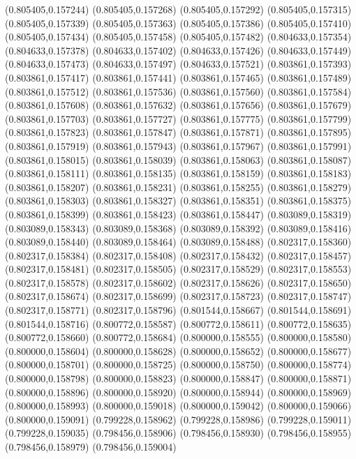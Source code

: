 (0.805405,0.157244)
(0.805405,0.157268)
(0.805405,0.157292)
(0.805405,0.157315)
(0.805405,0.157339)
(0.805405,0.157363)
(0.805405,0.157386)
(0.805405,0.157410)
(0.805405,0.157434)
(0.805405,0.157458)
(0.805405,0.157482)
(0.804633,0.157354)
(0.804633,0.157378)
(0.804633,0.157402)
(0.804633,0.157426)
(0.804633,0.157449)
(0.804633,0.157473)
(0.804633,0.157497)
(0.804633,0.157521)
(0.803861,0.157393)
(0.803861,0.157417)
(0.803861,0.157441)
(0.803861,0.157465)
(0.803861,0.157489)
(0.803861,0.157512)
(0.803861,0.157536)
(0.803861,0.157560)
(0.803861,0.157584)
(0.803861,0.157608)
(0.803861,0.157632)
(0.803861,0.157656)
(0.803861,0.157679)
(0.803861,0.157703)
(0.803861,0.157727)
(0.803861,0.157775)
(0.803861,0.157799)
(0.803861,0.157823)
(0.803861,0.157847)
(0.803861,0.157871)
(0.803861,0.157895)
(0.803861,0.157919)
(0.803861,0.157943)
(0.803861,0.157967)
(0.803861,0.157991)
(0.803861,0.158015)
(0.803861,0.158039)
(0.803861,0.158063)
(0.803861,0.158087)
(0.803861,0.158111)
(0.803861,0.158135)
(0.803861,0.158159)
(0.803861,0.158183)
(0.803861,0.158207)
(0.803861,0.158231)
(0.803861,0.158255)
(0.803861,0.158279)
(0.803861,0.158303)
(0.803861,0.158327)
(0.803861,0.158351)
(0.803861,0.158375)
(0.803861,0.158399)
(0.803861,0.158423)
(0.803861,0.158447)
(0.803089,0.158319)
(0.803089,0.158343)
(0.803089,0.158368)
(0.803089,0.158392)
(0.803089,0.158416)
(0.803089,0.158440)
(0.803089,0.158464)
(0.803089,0.158488)
(0.802317,0.158360)
(0.802317,0.158384)
(0.802317,0.158408)
(0.802317,0.158432)
(0.802317,0.158457)
(0.802317,0.158481)
(0.802317,0.158505)
(0.802317,0.158529)
(0.802317,0.158553)
(0.802317,0.158578)
(0.802317,0.158602)
(0.802317,0.158626)
(0.802317,0.158650)
(0.802317,0.158674)
(0.802317,0.158699)
(0.802317,0.158723)
(0.802317,0.158747)
(0.802317,0.158771)
(0.802317,0.158796)
(0.801544,0.158667)
(0.801544,0.158691)
(0.801544,0.158716)
(0.800772,0.158587)
(0.800772,0.158611)
(0.800772,0.158635)
(0.800772,0.158660)
(0.800772,0.158684)
(0.800000,0.158555)
(0.800000,0.158580)
(0.800000,0.158604)
(0.800000,0.158628)
(0.800000,0.158652)
(0.800000,0.158677)
(0.800000,0.158701)
(0.800000,0.158725)
(0.800000,0.158750)
(0.800000,0.158774)
(0.800000,0.158798)
(0.800000,0.158823)
(0.800000,0.158847)
(0.800000,0.158871)
(0.800000,0.158896)
(0.800000,0.158920)
(0.800000,0.158944)
(0.800000,0.158969)
(0.800000,0.158993)
(0.800000,0.159018)
(0.800000,0.159042)
(0.800000,0.159066)
(0.800000,0.159091)
(0.799228,0.158962)
(0.799228,0.158986)
(0.799228,0.159011)
(0.799228,0.159035)
(0.798456,0.158906)
(0.798456,0.158930)
(0.798456,0.158955)
(0.798456,0.158979)
(0.798456,0.159004)
